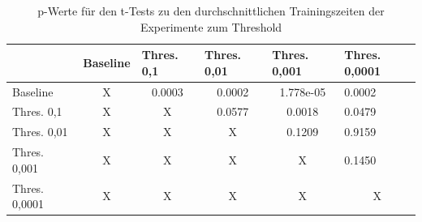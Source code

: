 \begin{table}[]
\caption{p-Werte für den t-Tests zu den durchschnittlichen Trainingszeiten der Experimente zum Threshold}
\begin{tabular}{l|c|c|c|c|l|}
\cline{2-6}
                                       & \multicolumn{1}{l|}{Baseline} & \multicolumn{1}{l|}{Thres. 0,1} & \multicolumn{1}{l|}{Thres. 0,01} & \multicolumn{1}{l|}{Thres. 0,001} & Thres. 0,0001               \\ \hline
\multicolumn{1}{|l|}{Baseline}         & X                             & 0.0003                             & 0.0002                              & 1.778e-05                            & 0.0002                         \\ \hline
\multicolumn{1}{|l|}{Thres. 0,1}    & X                             & X                                  & \cellcolor[HTML]{FE0000}0.0577      & 0.0018                               & 0.0479                         \\ \hline
\multicolumn{1}{|l|}{Thres. 0,01}   & X                             & X                                  & X                                   & \cellcolor[HTML]{FE0000}0.1209       & \cellcolor[HTML]{FE0000}0.9159 \\ \hline
\multicolumn{1}{|l|}{Thres. 0,001}  & X                             & X                                  & X                                   & X                                    & \cellcolor[HTML]{FE0000}0.1450 \\ \hline
\multicolumn{1}{|l|}{Thres. 0,0001} & X                             & X                                  & X                                   & X                                    & \multicolumn{1}{c|}{X}         \\ \hline
\end{tabular}
\label{tab:thres1}
\end{table}



